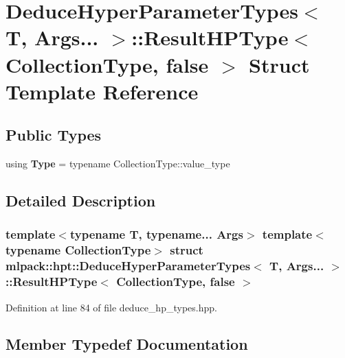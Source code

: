 \section{Deduce\+Hyper\+Parameter\+Types$<$ T, Args... $>$\+:\+:Result\+H\+P\+Type$<$ Collection\+Type, false $>$ Struct Template Reference}
\label{structmlpack_1_1hpt_1_1DeduceHyperParameterTypes_3_01T_00_01Args_8_8_8_01_4_1_1ResultHPType_3_01CollectionType_00_01false_01_4}
\subsection*{Public Types}
\begin{DoxyCompactItemize}
\item 
using \textbf{ Type} = typename Collection\+Type\+::value\+\_\+type
\end{DoxyCompactItemize}


\subsection{Detailed Description}
\subsubsection*{template$<$typename T, typename... Args$>$\newline
template$<$typename Collection\+Type$>$\newline
struct mlpack\+::hpt\+::\+Deduce\+Hyper\+Parameter\+Types$<$ T, Args... $>$\+::\+Result\+H\+P\+Type$<$ Collection\+Type, false $>$}



Definition at line 84 of file deduce\+\_\+hp\+\_\+types.\+hpp.



\subsection{Member Typedef Documentation}
\mbox{\label{structmlpack_1_1hpt_1_1DeduceHyperParameterTypes_3_01T_00_01Args_8_8_8_01_4_1_1ResultHPType_3_01CollectionType_00_01false_01_4_a3c17e8c74759e8a51edcee28b5d4cc01}} 
